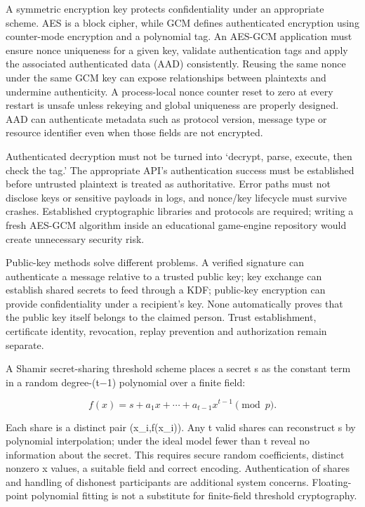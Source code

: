 A symmetric encryption key protects confidentiality under an appropriate scheme. AES is a block cipher, while GCM defines authenticated encryption using counter-mode encryption and a polynomial tag. An AES-GCM application must ensure nonce uniqueness for a given key, validate authentication tags and apply the associated authenticated data (AAD) consistently. Reusing the same nonce under the same GCM key can expose relationships between plaintexts and undermine authenticity. A process-local nonce counter reset to zero at every restart is unsafe unless rekeying and global uniqueness are properly designed. AAD can authenticate metadata such as protocol version, message type or resource identifier even when those fields are not encrypted.

Authenticated decryption must not be turned into `decrypt, parse, execute, then check the tag.' The appropriate API's authentication success must be established before untrusted plaintext is treated as authoritative. Error paths must not disclose keys or sensitive payloads in logs, and nonce/key lifecycle must survive crashes. Established cryptographic libraries and protocols are required; writing a fresh AES-GCM algorithm inside an educational game-engine repository would create unnecessary security risk.

Public-key methods solve different problems. A verified signature can authenticate a message relative to a trusted public key; key exchange can establish shared secrets to feed through a KDF; public-key encryption can provide confidentiality under a recipient's key. None automatically proves that the public key itself belongs to the claimed person. Trust establishment, certificate identity, revocation, replay prevention and authorization remain separate.

A Shamir secret-sharing threshold scheme places a secret s as the constant term in a random degree-(t−1) polynomial over a finite field:

\[
f(x)=s+a_1x+\cdots+a_{t-1}x^{t-1}\pmod p.
\]

Each share is a distinct pair (x\_i,f(x\_i)). Any t valid shares can reconstruct s by polynomial interpolation; under the ideal model fewer than t reveal no information about the secret. This requires secure random coefficients, distinct nonzero x values, a suitable field and correct encoding. Authentication of shares and handling of dishonest participants are additional system concerns. Floating-point polynomial fitting is not a substitute for finite-field threshold cryptography.

